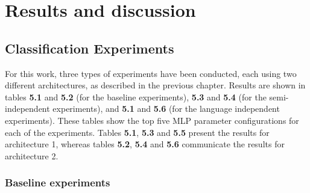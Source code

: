 
\chapter{Results and discussion}
\label{ch:omnisvoluptas}




\section{Classification Experiments}

For this work, three types of experiments have been conducted, each using two different architectures, as described in the previous chapter. Results are shown in tables \textbf{5.1} and \textbf{5.2} (for the baseline experiments), \textbf{5.3} and \textbf{5.4} (for the semi-independent experiments), and \textbf{5.1} and \textbf{5.6} (for the language independent experiments). These tables show the top five MLP parameter configurations for each of the experiments. Tables \textbf{5.1}, \textbf{5.3} and \textbf{5.5} present the results for architecture 1, whereas tables \textbf{5.2}, \textbf{5.4} and \textbf{5.6} communicate the results for architecture 2.

\subsection{Baseline experiments}

